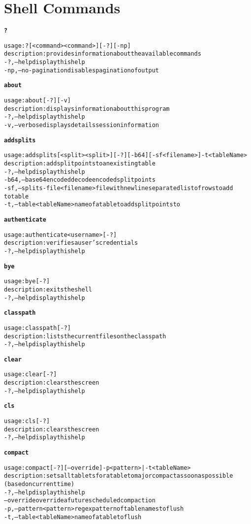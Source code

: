 \chapter{Shell Commands}
\begin{alltt}
\textbf{?}

    usage: ? [ <command>{ <command>} ] [-?] [-np]
    description: provides information about the available commands
      -?,--help  display this help
      -np,--no-pagination  disables pagination of output

\textbf{about}

    usage: about [-?] [-v]
    description: displays information about this program
      -?,--help  display this help
      -v,--verbose	displays details session information

\textbf{addsplits}

    usage: addsplits [<split>{ <split>} ] [-?] [-b64] [-sf <filename>] -t <tableName>
    description: add split points to an existing table
      -?,--help  display this help
      -b64,--base64encoded	decode encoded split points
      -sf,--splits-file <filename>	file with newline separated list of rows to add
    	      to table
      -t,--table <tableName>  name of a table to add split points to

\textbf{authenticate}

    usage: authenticate <username> [-?]
    description: verifies a user's credentials
      -?,--help  display this help

\textbf{bye}

    usage: bye [-?]
    description: exits the shell
      -?,--help  display this help

\textbf{classpath}

    usage: classpath [-?]
    description: lists the current files on the classpath
      -?,--help  display this help

\textbf{clear}

    usage: clear [-?]
    description: clears the screen
      -?,--help  display this help

\textbf{cls}

    usage: cls [-?]
    description: clears the screen
      -?,--help  display this help

\textbf{compact}

    usage: compact [-?] [--override] -p <pattern> | -t <tableName>
    description: sets all tablets for a table to major compact as soon as possible
    	      (based on current time)
      -?,--help  display this help
      --override  override a future scheduled compaction
      -p,--pattern <pattern>  regex pattern of table names to flush
      -t,--table <tableName>  name of a table to flush


\end{alltt}
